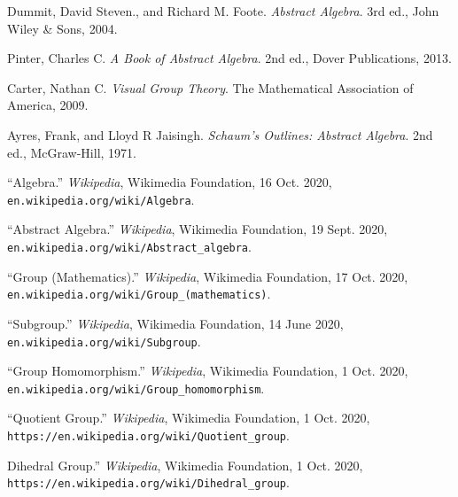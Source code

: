 \documentclass[11pt, reqno]{amsart}
\theoremstyle{plain}
\theoremstyle{definition}
\theoremstyle{example}
\begin{document}
\newpage
\begin{thebibliography}{9}

Dummit, David Steven., and Richard M. Foote. \textit{Abstract Algebra}. 3rd ed., John Wiley \& Sons, 2004. 

Pinter, Charles C. \textit{A Book of Abstract Algebra}. 2nd ed., Dover Publications, 2013. 

Carter, Nathan C. \textit{Visual Group Theory}. The Mathematical Association of America, 2009. 

Ayres, Frank, and Lloyd R Jaisingh. \textit{Schaum's Outlines: Abstract Algebra}. 2nd ed., McGraw-Hill, 1971. 

“Algebra.” \textit{Wikipedia}, Wikimedia Foundation, 16 Oct. 2020, \texttt{en.wikipedia.org/wiki/Algebra}. 

“Abstract Algebra.” \textit{Wikipedia}, Wikimedia Foundation, 19 Sept. 2020,\\ \texttt{en.wikipedia.org/wiki/Abstract\_algebra}. 

“Group (Mathematics).” \textit{Wikipedia}, Wikimedia Foundation, 17 Oct. 2020,\\ \texttt{en.wikipedia.org/wiki/Group\_(mathematics)}.

“Subgroup.” \textit{Wikipedia}, Wikimedia Foundation, 14 June 2020, \texttt{en.wikipedia.org/wiki/Subgroup}. 

“Group Homomorphism.” \textit{Wikipedia}, Wikimedia Foundation, 1 Oct. 2020,\\ \texttt{en.wikipedia.org/wiki/Group\_homomorphism}.  

“Quotient Group.” \textit{Wikipedia}, Wikimedia Foundation, 1 Oct. 2020,\\ \texttt{https://en.wikipedia.org/wiki/Quotient\_group}. 

Dihedral Group.” \textit{Wikipedia}, Wikimedia Foundation, 1 Oct. 2020,\\ \texttt{https://en.wikipedia.org/wiki/Dihedral\_group}. 
\end{thebibliography}
\end{document}
